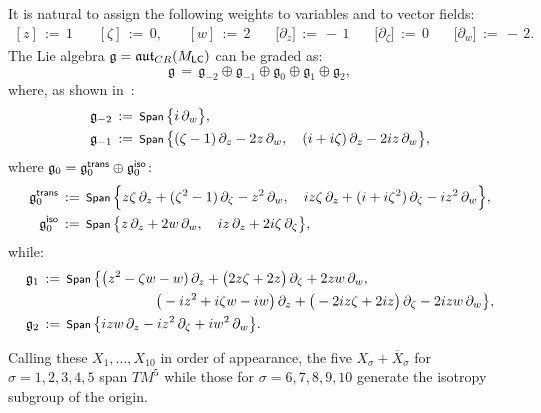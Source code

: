 \documentclass[12pt,twoside,leqno,openany]{amsart}
\begin{document}
It is natural to assign the following weights to variables and to
vector fields:
\leqnomode{}
\begin{align}
\label{weighting-z-zeta-w}
[z]
\,:=\,
1
\ \ \ \ \ \ \ \ 
[\zeta]
\,:=\,
0,
\ \ \ \ \ \ \ \ 
[w]
\,:=\,
2
\ \ \ \ \ \ \ \ 
\big[\partial_z\big]
\,:=\,
-\,1
\ \ \ \ \ \ \ \ 
\big[\partial_\zeta\big]
\,:=\,
0
\ \ \ \ \ \ \ \ 
\big[\partial_w\big]
\,:=\,
-\,2.
\end{align}
The Lie algebra $\mathfrak{g} = \mathfrak{aut}_{CR}(M_{\sf LC})$ can
be graded as:
\[
\mathfrak{g}
\,=\,
\mathfrak{g}_{-2}
\oplus
\mathfrak{g}_{-1}
\oplus
\mathfrak{g}_0
\oplus
\mathfrak{g}_1
\oplus
\mathfrak{g}_2,
\]
where, as shown in~{\cite{Gaussier-Merker-2003,
Foo-Merker-Ta-2019}}:
\[
\aligned
\mathfrak{g}_{-2}
&
\,:=\,
\Span\,
\big\{
i\,\partial_w
\big\},
\\
\mathfrak{g}_{-1}
&
\,:=\,
\Span\,
\big\{
(\zeta-1)\,\partial_z
-
2z\,\partial_w,
\ \ \
(i+i\zeta)\,\partial_z
-
2iz\,\partial_w
\big\},
\endaligned
\]
where $\mathfrak{g}_0 = \mathfrak{g}_0^{\sf trans} 
\oplus \mathfrak{g}_0^{\sf iso}$:
\[
\aligned
\mathfrak{g}_0^{\sf trans}
&
\,:=\,
\Span\,
\Big\{
z\zeta\,\partial_z
+
(\zeta^2-1)\,\partial_\zeta
-
z^2\,\partial_w,
\ \ \
iz\zeta\,\partial_z
+
(i+i\zeta^2)\,\partial_\zeta
-
iz^2\,\partial_w
\Big\},
\\
\mathfrak{g}_0^{\sf iso}
&
\,:=\,
\Span\,
\big\{
z\,\partial_z
+
2w\,\partial_w,
\ \ \ 
iz\,\partial_z
+
2i\zeta\,\partial_\zeta
\big\},
\endaligned
\]
while:
\[
\aligned
\mathfrak{g}_1
&
\,:=\,
\Span\,
\big\{
\big(z^2-\zeta w-w)\,\partial_z
+
\big(2z\zeta+2z\big)\,\partial_\zeta
+
2zw\,\partial_w,
\\
&
\ \ \ \ \ \ \ \ \ \ \ \ \ \ \ \ \ \ \ \
\ \ \ \ \ 
\big(-iz^2+i\zeta w-iw\big)\,\partial_z
+
\big(-2iz\zeta+2iz\big)\,\partial_\zeta
-
2izw\,\partial_w
\big\},
\\
\mathfrak{g}_2
&
\,:=\,
\Span\,
\big\{
izw\,\partial_z
-
iz^2\,\partial_\zeta
+
iw^2\,\partial_w
\big\}.
\endaligned
\]

Calling these $X_1, \dots, X_{10}$ in order of appearance,
the five $X_\sigma + \overline{X}_\sigma$ for $\sigma = 1, 2, 3, 4, 5$
span $TM^5$ while those for $\sigma = 6, 7, 8, 9, 10$
generate the isotropy subgroup of the origin.

\smallskip
\end{document}
